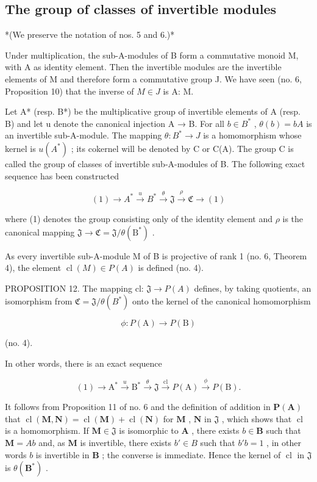 \subsection{The group of classes of invertible modules}

*(We preserve the notation of nos. 5 and 6.)*

Under multiplication, the sub-A-modules of B form a commutative monoid M, with A as identity element. Then the invertible modules are the invertible elements of M and therefore form a commutative group J. We have seen (no. 6, Proposition 10) that the inverse of \(M \in J\) is A: M.

Let A* (resp. B*) be the multiplicative group of invertible elements of A (resp. B) and let u denote the canonical injection A → B. For all \(b \in B^{*}\) , \(\theta(b) = bA\) is an invertible sub-A-module. The mapping \(\theta: B^{*} \to J\) is a homomorphism whose kernel is \(u(A^{*})\) ; its cokernel will be denoted by C or C(A). The group C is called the group of classes of invertible sub-A-modules of B. The following exact sequence has been constructed

\[
(1) \longrightarrow A ^ {*} \stackrel {u} {\longrightarrow} B ^ {*} \stackrel {\theta} {\longrightarrow} \mathfrak {J} \stackrel {\rho} {\longrightarrow} \mathfrak {C} \longrightarrow (1)\tag{10}
\]

where (1) denotes the group consisting only of the identity element and \(\rho\) is the canonical mapping \(\mathfrak{J} \to \mathfrak{C} = \mathfrak{J}/\theta(\mathrm{B}^*)\) .

As every invertible sub-A-module M of B is projective of rank 1 (no. 6, Theorem 4), the element \(\operatorname{cl}(M) \in P(A)\) is defined (no. 4).

PROPOSITION 12. The mapping cl: \(\mathfrak{J} \to P(A)\) defines, by taking quotients, an isomorphism from \(\mathfrak{C} = \mathfrak{J}/\theta(B^{*})\) onto the kernel of the canonical homomorphism

\[
\phi \colon P (\mathrm{A}) \to P (\mathrm{B})
\]

(no. 4).

In other words, there is an exact sequence

\[
(1) \longrightarrow \mathrm{A} ^ {*} \stackrel {u} {\longrightarrow} \mathrm{B} ^ {*} \stackrel {\theta} {\longrightarrow} \mathfrak {J} \stackrel {\mathrm{cl}} {\longrightarrow} P (\mathrm{A}) \stackrel {\phi} {\longrightarrow} P (\mathrm{B}).\tag{11}
\]

It follows from Proposition 11 of no. 6 and the definition of addition in \(\mathbf{P}(\mathbf{A})\) that \(\operatorname{cl}(\mathbf{M},\mathbf{N}) = \operatorname{cl}(\mathbf{M}) + \operatorname{cl}(\mathbf{N})\) for \(\mathbf{M}\) , \(\mathbf{N}\) in \(\mathfrak{J}\) , which shows that \(\operatorname{cl}\) is a homomorphism. If \(\mathbf{M} \in \mathfrak{J}\) is isomorphic to \(\mathbf{A}\) , there exists \(b \in \mathbf{B}\) such that \(\mathbf{M} = Ab\) and, as \(\mathbf{M}\) is invertible, there exists \(b' \in B\) such that \(b'b = 1\) , in other words \(b\) is invertible in \(\mathbf{B}\) ; the converse is immediate. Hence the kernel of \(\operatorname{cl}\) in \(\mathfrak{J}\) is \(\theta(\mathbf{B}^*)\) .

